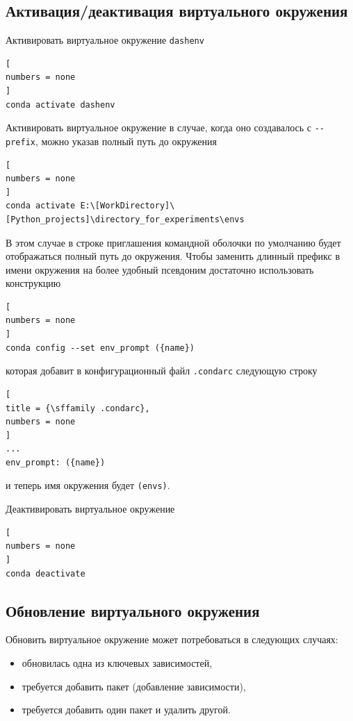 \documentclass[%
	11pt,
	a4paper,
	utf8,
		]{article}
\begin{document}
\subsection{Активация/деактивация виртуального окружения}

Активировать виртуальное окружение \texttt{dashenv}

\begin{lstlisting}[
numbers = none
]
conda activate dashenv
\end{lstlisting}

Активировать виртуальное окружение в случае, когда оно создавалось с \lstinline{--prefix}, можно указав полный путь до окружения
\begin{lstlisting}[
numbers = none
]
conda activate E:\[WorkDirectory]\[Python_projects]\directory_for_experiments\envs
\end{lstlisting}

В этом случае в строке приглашения командной оболочки по умолчанию будет отображаться полный путь до окружения. Чтобы заменить длинный префикс в имени окружения на более удобный псевдоним достаточно использовать конструкцию

\begin{lstlisting}[
numbers = none
]
conda config --set env_prompt ({name})
\end{lstlisting}
которая добавит в конфигурационный файл \texttt{.condarc} следующую строку

\begin{lstlisting}[
title = {\sffamily .condarc},
numbers = none
]
...
env_prompt: ({name})
\end{lstlisting}
и теперь имя окружения будет \texttt{(envs)}.

Деактивировать виртуальное окружение

\begin{lstlisting}[
numbers = none
]
conda deactivate
\end{lstlisting}

\subsection{Обновление виртуального окружения}

Обновить виртуальное окружение может потребоваться в следующих случаях:

\begin{itemize}
	\item обновилась одна из ключевых зависимостей,
	
	\item требуется добавить пакет (добавление зависимости),
	
	\item требуется добавить один пакет и удалить другой.
\end{itemize}
\end{document}
